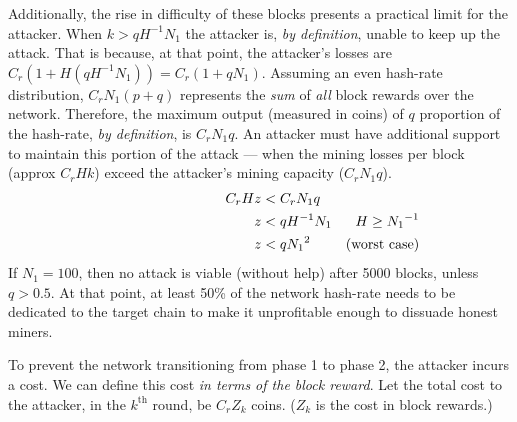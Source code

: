 Additionally, the rise in difficulty of these blocks presents a practical limit for the attacker.
When $k > q H^{-1} N_1$ the attacker is, \emph{by definition}, unable to keep up the attack.
That is because, at that point, the attacker's losses are $C_r (1 + H (q H^{-1} N_1)) = C_r (1 + q N_1)$.
Assuming an even hash-rate distribution, $C_r N_1 (p + q)$ represents the \emph{sum} of \emph{all} block rewards over the network.
Therefore, the maximum output (measured in coins) of $q$ proportion of the hash-rate, \emph{by definition}, is $C_r N_1 q$.
An attacker must have additional support to maintain this portion of the attack --- when the mining losses per block (approx $C_r H k$) exceed the attacker's mining capacity ($C_r N_1 q$).
\begin{align}
    \text{\hspace{8em}}
    && C_r H z &< C_r N_1 q \nonumber \\
    && z &< q H^{-1} N_1 & H \ge {N_1}^{-1} \nonumber \\
    && z &< q {N_1}^2 & \text{(worst case)} \nonumber
\end{align}
If $N_1 = 100$, then no attack is viable (without help) after 5000 blocks, unless $q > 0.5$.
At that point, at least 50\% of the network hash-rate needs to be dedicated to the target chain to make it unprofitable enough to dissuade honest miners.

\label{sec:bribe-stop-1-to-2}

To prevent the network transitioning from phase 1 to phase 2, the attacker incurs a cost.
We can define this cost \emph{in terms of the block reward}.
Let the total cost to the attacker, in the $k^\text{th}$ round, be $C_r Z_k$ coins.
($Z_k$ is the cost in block rewards.)

